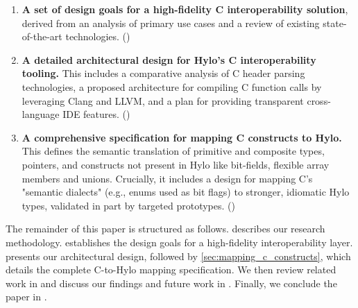 \begin{enumerate}
    \item \textbf{A set of design goals for a high-fidelity C interoperability solution}, derived from an analysis of primary use cases and a review of existing state-of-the-art technologies. ()   
    \item \textbf{A detailed architectural design for Hylo's C interoperability tooling.} This includes a comparative analysis of C header parsing technologies, a proposed architecture for compiling C function calls by leveraging Clang and LLVM, and a plan for providing transparent cross-language IDE features. ()
    \item \textbf{A comprehensive specification for mapping C constructs to Hylo.} This defines the semantic translation of primitive and composite types, pointers, and constructs not present in Hylo like bit-fields, flexible array members and unions. Crucially, it includes a design for mapping C's "semantic dialects" (e.g., enums used as bit flags) to stronger, idiomatic Hylo types, validated in part by targeted prototypes. ()
\end{enumerate}
The remainder of this paper is structured as follows.  describes our research methodology.  establishes the design goals for a high-fidelity interoperability layer.  presents our architectural design, followed by \autoref{sec:mapping_c_constructs}, which details the complete C-to-Hylo mapping specification. We then review related work in  and discuss our findings and future work in . Finally, we conclude the paper in .

    
    
    
    
